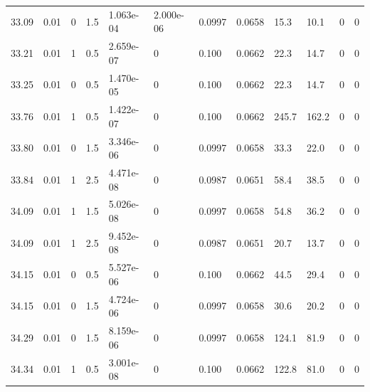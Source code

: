 \documentclass[preview]{standalone}
\begin{document}
{{{{{{{\begin{tabular}{L{1.2cm}C{1.2cm} C{0.3cm}C{0.5cm} C{1.4cm}C{1.4cm} C{1.4cm}C{1.4cm} C{1.6cm}C{1.6cm} C{1.6cm}C{1.6cm}}
  33.09  &  0.01  & 0     & 1.5 &  1.063e-04  & 2.000e-06  &  0.0997&   0.0658& 15.3 & 10.1   &  0 & 0  \\ 
  33.21  &  0.01  & 1     & 0.5 &  2.659e-07  & 0  &  0.100&   0.0662& 22.3 & 14.7   &  0 & 0  \\ 
  33.25  &  0.01  & 0     & 0.5 &  1.470e-05  & 0  &  0.100&   0.0662& 22.3 & 14.7   &  0 & 0  \\ 
  33.76  &  0.01  & 1     & 0.5 &  1.422e-07  & 0  &  0.100&   0.0662& 245.7 & 162.2   &  0 & 0  \\ 
  33.80  &  0.01  & 0     & 1.5 &  3.346e-06  & 0  &  0.0997&   0.0658& 33.3 & 22.0   &  0 & 0  \\ 
  33.84  &  0.01  & 1     & 2.5 &  4.471e-08  & 0  &  0.0987&   0.0651& 58.4 & 38.5   &  0 & 0  \\ 
  34.09  &  0.01  & 1     & 1.5 &  5.026e-08  & 0  &  0.0997&   0.0658& 54.8 & 36.2   &  0 & 0  \\ 
  34.09  &  0.01  & 1     & 2.5 &  9.452e-08  & 0  &  0.0987&   0.0651& 20.7 & 13.7   &  0 & 0  \\ 
  34.15  &  0.01  & 0     & 0.5 &  5.527e-06  & 0  &  0.100&   0.0662& 44.5 & 29.4   &  0 & 0  \\ 
  34.15  &  0.01  & 0     & 1.5 &  4.724e-06  & 0  &  0.0997&   0.0658& 30.6 & 20.2   &  0 & 0  \\ 
  34.29  &  0.01  & 0     & 1.5 &  8.159e-06  & 0  &  0.0997&   0.0658& 124.1 & 81.9   &  0 & 0  \\ 
  34.34  &  0.01  & 1     & 0.5 &  3.001e-08  & 0  &  0.100&   0.0662& 122.8 & 81.0   &  0 & 0  \\ 
\hline 
\end{tabular} 

}}}}}}}
\end{document}
